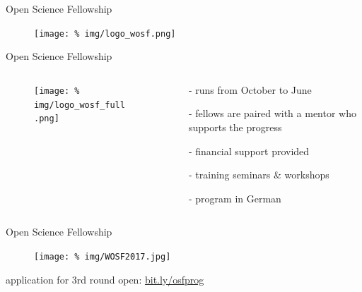 \begin{frame}{Open Science Fellowship}

\begin{figure}
  \centering
  \texttt{[image: \%
    img/logo\_wosf.png]} %
\end{figure}

  
\end{frame}




\begin{frame}{Open Science Fellowship}

  \begin{columns}
    \begin{column}{.55\textwidth}


      \begin{figure}
        \centering
        \texttt{[image: \%
        img/logo\_wosf\_full.png]} %
      \end{figure}
      
     

    \end{column}
    \begin{column}{.45\textwidth}
      \minipage[c][0.625\textheight][s]{\columnwidth}

      \vspace{0.2cm}
      
      \begin{itemize}[leftmargin=*]

      \item[-] runs from October to June
        
      \item[-] fellows are paired with a mentor who supports the progress

      \item[-] financial support provided

      \item[-] training seminars \& workshops
        
      \item[-] program in German
        
      \end{itemize}

      \endminipage      
    \end{column}
  \end{columns}
  
\end{frame}




\begin{frame}{Open Science Fellowship}

  \begin{figure}
    \centering
    \texttt{[image: \%
    img/WOSF2017.jpg]} %
  \end{figure}

  \begin{center}
  application for 3rd round open: \href{http://bit.ly/osfprog}{bit.ly/osfprog}
  \end{center}
  


\end{frame}

